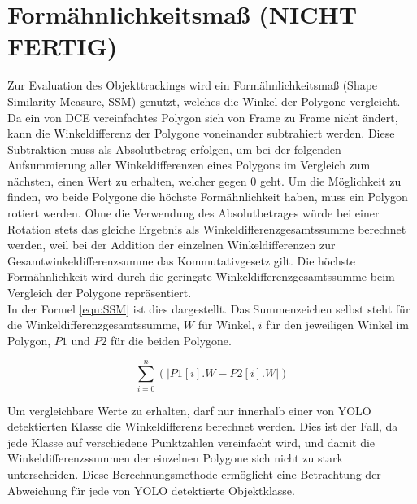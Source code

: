 \section{Formähnlichkeitsmaß (NICHT FERTIG)}{ \label{theo:SSM}
	Zur Evaluation des Objekttrackings wird ein Formähnlichkeitsmaß (\glqq Shape Similarity Measure\grqq{}, SSM) genutzt, welches die Winkel der Polygone vergleicht. \\
	Da ein von DCE vereinfachtes Polygon sich von Frame zu Frame nicht ändert, kann die Winkeldifferenz der Polygone voneinander subtrahiert werden. Diese Subtraktion muss als Absolutbetrag erfolgen, um bei der folgenden Aufsummierung aller Winkeldifferenzen eines Polygons im Vergleich zum nächsten, einen Wert zu erhalten, welcher gegen 0 geht. Um die Möglichkeit zu finden, wo beide Polygone die höchste Formähnlichkeit haben, muss ein Polygon rotiert werden. Ohne die Verwendung des Absolutbetrages würde bei einer Rotation stets das gleiche Ergebnis als Winkeldifferenzgesamtssumme berechnet werden, weil bei der Addition der einzelnen Winkeldifferenzen zur Gesamtwinkeldifferenzsumme das Kommutativgesetz gilt. Die höchste Formähnlichkeit wird durch die geringste Winkeldifferenzgesamtssumme beim Vergleich der Polygone repräsentiert.\\
	In der Formel \ref{equ:SSM} ist dies dargestellt. Das Summenzeichen selbst steht für die Winkeldifferenzgesamtssumme, $W$ für Winkel, $i$ für den jeweiligen Winkel im Polygon, $P1$ und $P2$ für die beiden Polygone.

	\begin{equation} \label{equ:SSM}
		\sum_{i = 0}^{n}  (\lvert P1[i].W - P2[i].W \rvert)
	\end{equation}	

	Um vergleichbare Werte zu erhalten, darf nur innerhalb einer von YOLO detektierten Klasse die Winkeldifferenz berechnet werden. Dies ist der Fall, da jede Klasse auf verschiedene Punktzahlen vereinfacht wird, und damit die Winkeldifferenzssummen der einzelnen Polygone sich nicht zu stark unterscheiden. Diese Berechnungsmethode ermöglicht eine Betrachtung der Abweichung für jede von YOLO detektierte Objektklasse.  
	
}